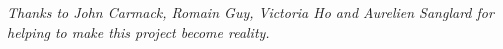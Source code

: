 \clearpage
\thispagestyle{empty}
\vspace*{\fill}
\begin{center}
\begin{minipage}{.6\textwidth}
\emph{Thanks to John Carmack, Romain Guy, Victoria Ho and Aurelien Sanglard for helping to make this project become reality.\\}
\end{minipage}
\end{center}
\vfill
\clearpage
